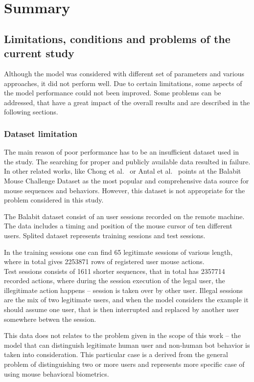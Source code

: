 \chapter{Summary}

\section{Limitations, conditions and problems of the current study}
Although the model was considered with different set of parameters and various approaches, it did not perform well.
Due to certain limitations, some aspects of the model performance could not been improved.
Some problems can be addressed, that have a great impact of the overall results and are described in the following sections.

\subsection{Dataset limitation}
The main reason of poor performance has to be an insufficient dataset used in the study.
The searching for proper and publicly available data resulted in failure.
In other related works, like Chong et al.~\cite{Main} or Antal et al.~\cite{balabit1} points at the Balabit Mouse Challenge Dataset as the most popular and comprehensive data source for mouse sequences and behaviors.
However, this dataset is not appropriate for the problem considered in this study.

The Balabit dataset consist of an user sessions recorded on the remote machine. The data includes a timing and position of the mouse cursor of ten different users.
Splited dataset represents training sessions and test sessions.

In the training sessions one can find \num{65} legitimate sessions of various length, where in total gives \num{2253871} rows of registered user mouse actions.\\
Test sessions consists of \num{1611} shorter sequences, that in total has \num{2357714} recorded actions, where during the session execution of the legal user, the illegitimate action happens – session is taken over by other user. Illegal sessions are the mix of two legitimate users, and when the model considers the example it should assume one user, that is then interrupted and replaced by another user somewhere betwen the session.

This data does not relates to the problem given in the scope of this work – the model that can distinguish legitimate human user and non-human bot behavior is taken into consideration. This particular case is a derived from the general problem of distinguishing two or more users and represents more specific case of using mouse behavioral biometrics.

